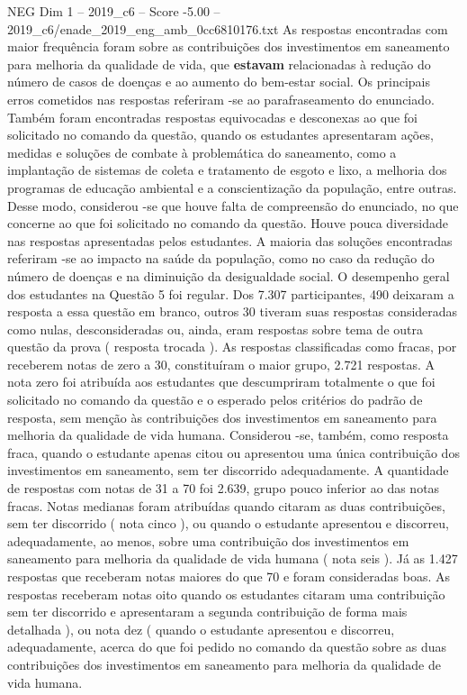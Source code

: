 \begin{textsample}{NEG Dim 1 – 2019\_c6 – Score -5.00 – 2019\_c6/enade\_2019\_eng\_amb\_0cc6810176.txt}
As respostas encontradas com maior frequência foram sobre as contribuições dos investimentos em saneamento para melhoria da qualidade de vida, que \textbf{estavam} relacionadas à redução do número de casos de doenças e ao aumento do bem-estar social.
Os principais erros cometidos nas respostas referiram -se ao parafraseamento do enunciado.
Também foram encontradas respostas equivocadas e desconexas ao que foi solicitado no comando da questão, quando os estudantes apresentaram ações, medidas e soluções de combate à problemática do saneamento, como a implantação de sistemas de coleta e tratamento de esgoto e lixo, a melhoria dos programas de educação ambiental e a conscientização da população, entre outras.
Desse modo, considerou -se que houve falta de compreensão do enunciado, no que concerne ao que foi solicitado no comando da questão.
Houve pouca diversidade nas respostas apresentadas pelos estudantes.
A maioria das soluções encontradas referiram -se ao impacto na saúde da população, como no caso da redução do número de doenças e na diminuição da desigualdade social.
O desempenho geral dos estudantes na Questão 5 foi regular.
Dos 7.307 participantes, 490 deixaram a resposta a essa questão em branco, outros 30 tiveram suas respostas consideradas como nulas, desconsideradas ou, ainda, eram respostas sobre tema de outra questão da prova ( resposta trocada ).
As respostas classificadas como fracas, por receberem notas de zero a 30, constituíram o maior grupo, 2.721 respostas.
A nota zero foi atribuída aos estudantes que descumpriram totalmente o que foi solicitado no comando da questão e o esperado pelos critérios do padrão de resposta, sem menção às contribuições dos investimentos em saneamento para melhoria da qualidade de vida humana.
Considerou -se, também, como resposta fraca, quando o estudante apenas citou ou apresentou uma única contribuição dos investimentos em saneamento, sem ter discorrido adequadamente.
A quantidade de respostas com notas de 31 a 70 foi 2.639, grupo pouco inferior ao das notas fracas.
Notas medianas foram atribuídas quando citaram as duas contribuições, sem ter discorrido ( nota cinco ), ou quando o estudante apresentou e discorreu, adequadamente, ao menos, sobre uma contribuição dos investimentos em saneamento para melhoria da qualidade de vida humana ( nota seis ).
Já as 1.427 respostas que receberam notas maiores do que 70 e foram consideradas boas.
As respostas receberam notas oito quando os estudantes citaram uma contribuição sem ter discorrido e apresentaram a segunda contribuição de forma mais detalhada ), ou nota dez ( quando o estudante apresentou e discorreu, adequadamente, acerca do que foi pedido no comando da questão sobre as duas contribuições dos investimentos em saneamento para melhoria da qualidade de vida humana.

\end{textsample}
